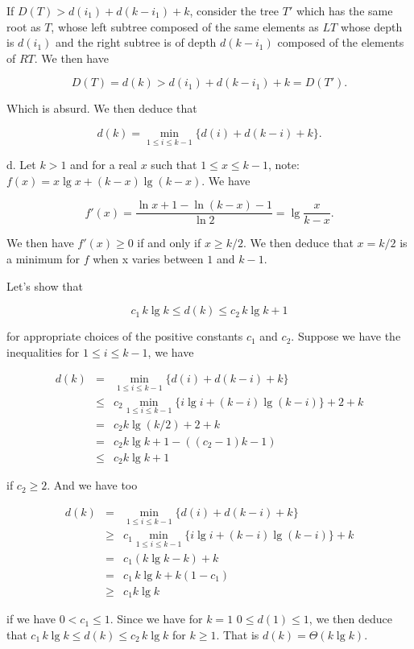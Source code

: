 \documentclass[a4paper,12pt]{article}
\newcommand{\subpar}[1]{\medskip \noindent #1.}
\begin{document}
If $D(T) > d(i_1) + d(k-i_1) + k$, consider the tree $T'$ which has
the same root as $T$, whose left subtree composed of the same elements
as $LT$ whose depth is $d(i_1)$ and the right subtree is of depth
$d(k-i_1)$ composed of the elements of $RT$.  We then have

\[ D(T) = d(k) > d(i_1) + d(k-i_1) + k = D(T').\]

Which is absurd.  We then deduce that

\[ d(k) = \min_{1\le i\le k-1}\{d(i) + d(k-i) + k\}.\]

\subpar{d}  Let $k>1$ and for a real $x$ such that $1 \le x\le k-1$,
note: $f(x) = x \lg x + (k-x)\lg (k-x)$.  We have

\[  f'(x) = \frac{\ln x + 1 - \ln(k-x) - 1}{\ln 2} = \lg\frac{x}{k-x}.\]

We then have $f'(x) \ge 0$ if and only if $x \ge k/2$.  We then deduce
that $x = k/2$ is a minimum for $f$ when x varies between $1$ and
$k-1$.

\medskip
Let's show that

\[ c_1\,k\lg k \le d(k) \le c_2\,k\lg k + 1\]

for appropriate choices of the positive constants $c_1$ and $c_2$.
Suppose we have the inequalities for $1\le i\le k-1$, we have

\begin{eqnarray*}
  d(k) &=& \min_{1\le i\le k-1}\{ d(i) + d(k-i) + k\} \\
  &\le& c_2 \min_{1\le i\le k-1}\{i\lg i + (k-i)\lg (k-i) \} + 2
  + k\\
  &=& c_2 k \lg (k/2) + 2 + k \\
  &=& c_2 k \lg k + 1 - ((c_2 - 1)k - 1) \\
  &\le& c_2 k\lg k + 1
\end{eqnarray*}

if $c_2 \ge 2$.  And we have too

\begin{eqnarray*}
  d(k) &=& \min_{1\le i\le k-1}\{ d(i) + d(k-i) + k\} \\
  &\ge& c_1 \min_{1\le i\le k-1}\{ i \lg i + (k-i)\lg(k-i)\} + k \\
  &=& c_1 (k \lg k - k) + k \\
  &=& c_1\,k \lg k + k(1-c_1) \\
  &\ge& c_1k\lg k
\end{eqnarray*}

if we have $0 < c_1 \le 1$.  Since we have for $k=1$ $0 \le d(1) \le
1$, we then deduce that $c_1\,k\lg k \le d(k) \le c_2\,k\lg k$ for
$k\ge 1$.  That is $d(k) = \Theta(k\lg k)$.
\end{document}
